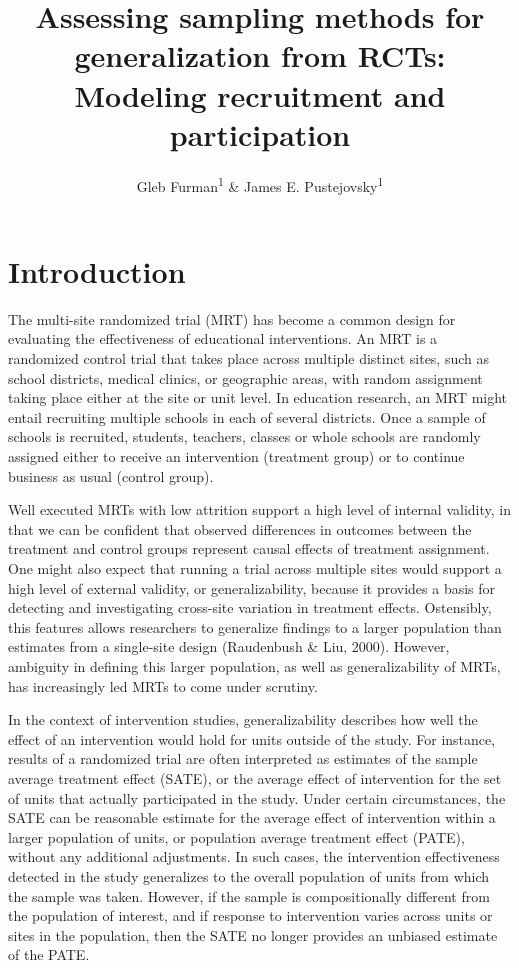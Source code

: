 \documentclass[english,man,floatsintext]{apa6}
\title{Assessing sampling methods for generalization from RCTs: Modeling recruitment and participation}
\author{Gleb Furman\textsuperscript{1} \& James E. Pustejovsky\textsuperscript{1}}
\date{}
\affiliation{\vspace{0.5cm}\textsuperscript{1} University of Texas at Austin}
\begin{document}
\maketitle

\hypertarget{introduction}{%
\section{Introduction}\label{introduction}}

The multi-site randomized trial (MRT) has become a common design for evaluating the effectiveness of educational interventions. An MRT is a randomized control trial that takes place across multiple distinct sites, such as school districts, medical clinics, or geographic areas, with random assignment taking place either at the site or unit level. In education research, an MRT might entail recruiting multiple schools in each of several districts. Once a sample of schools is recruited, students, teachers, classes or whole schools are randomly assigned either to receive an intervention (treatment group) or to continue business as usual (control group).

Well executed MRTs with low attrition support a high level of internal validity, in that we can be confident that observed differences in outcomes between the treatment and control groups represent causal effects of treatment assignment. One might also expect that running a trial across multiple sites would support a high level of external validity, or generalizability, because it provides a basis for detecting and investigating cross-site variation in treatment effects.
Ostensibly, this features allows researchers to generalize findings to a larger population than estimates from a single-site design (Raudenbush \& Liu, 2000). However, ambiguity in defining this larger population, as well as generalizability of MRTs, has increasingly led MRTs to come under scrutiny.

In the context of intervention studies, generalizability describes how well the effect of an intervention would hold for units outside of the study.
For instance, results of a randomized trial are often interpreted as estimates of the sample average treatment effect (SATE), or the average effect of intervention for the set of units that actually participated in the study.
Under certain circumstances, the SATE can be reasonable estimate for the average effect of intervention within a larger population of units, or population average treatment effect (PATE), without any additional adjustments. In such cases, the intervention effectiveness detected in the study generalizes to the overall population of units from which the sample was taken. However, if the sample is compositionally different from the population of interest, and if response to intervention varies across units or sites in the population, then the SATE no longer provides an unbiased estimate of the PATE.
\end{document}
